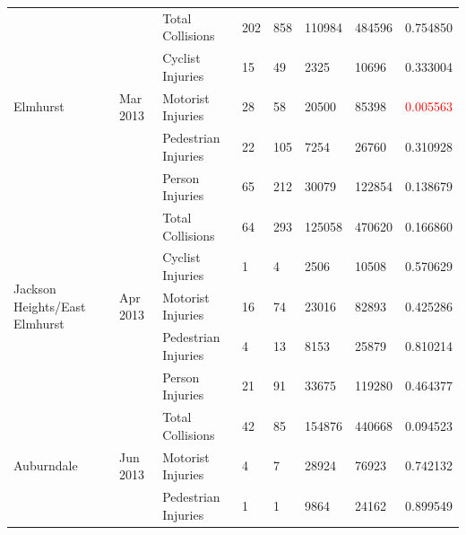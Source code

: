 \documentclass[10pt,journal,compsoc]{IEEEtran}
\begin{document}
\begin{table}[]
\begin{tabular}{|l|l|l|l|l|l|l|l|}
\multirow{5}{*}{Elmhurst}                      & \multirow{5}{*}{Mar 2013} & Total Collisions    & 202       & 858      & 110984     & 484596    & 0.754850 \\ \cline{3-8} 
                                               &                             & Cyclist Injuries    & 15        & 49       & 2325       & 10696     & 0.333004 \\ \cline{3-8} 
                                               &                             & Motorist Injuries   & 28        & 58       & 20500      & 85398     & \textcolor{red}{0.005563} \\ \cline{3-8} 
                                               &                             & Pedestrian Injuries & 22        & 105      & 7254       & 26760     & 0.310928 \\ \cline{3-8} 
                                               &                             & Person Injuries     & 65        & 212      & 30079      & 122854    & 0.138679 \\ \hline
\multirow{5}{*}{Jackson Heights/East Elmhurst} & \multirow{5}{*}{Apr 2013} & Total Collisions    & 64        & 293      & 125058     & 470620    & 0.166860 \\ \cline{3-8} 
                                               &                             & Cyclist Injuries    & 1         & 4        & 2506       & 10508     & 0.570629 \\ \cline{3-8} 
                                               &                             & Motorist Injuries   & 16        & 74       & 23016      & 82893     & 0.425286 \\ \cline{3-8} 
                                               &                             & Pedestrian Injuries & 4         & 13       & 8153       & 25879     & 0.810214 \\ \cline{3-8} 
                                               &                             & Person Injuries     & 21        & 91       & 33675      & 119280    & 0.464377 \\ \hline
\multirow{4}{*}{Auburndale}                    & \multirow{4}{*}{Jun 2013} & Total Collisions    & 42        & 85       & 154876     & 440668    & 0.094523 \\ \cline{3-8} 
                                               &                             & Motorist Injuries   & 4         & 7        & 28924      & 76923     & 0.742132 \\ \cline{3-8} 
                                               &                             & Pedestrian Injuries & 1         & 1        & 9864       & 24162     & 0.899549 \\ \cline{3-8} 

\end{tabular}
\end{table}
\end{document}
